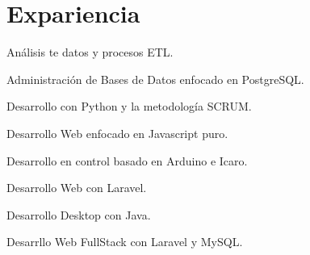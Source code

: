 \begin{minipage}[t]{0.66\textwidth} %


\section{Expariencia}

\vspace{\topsep} %
\begin{tightitemize}
\item Análisis te datos y procesos ETL.
\item Administración de Bases de Datos enfocado en PostgreSQL.
\item Desarrollo con Python y la metodología SCRUM.
\end{tightitemize}

\sectionspace %



\begin{tightitemize}
\item Desarrollo Web enfocado en Javascript puro.
\item Desarrollo en control basado en Arduino e Icaro.
\end{tightitemize}
\sectionspace %


\begin{tightitemize}
\item Desarrollo Web con Laravel.
\item Desarrollo Desktop con Java.
\end{tightitemize}
\sectionspace %


\begin{tightitemize}
\item Desarrllo Web FullStack con Laravel y MySQL.
\end{tightitemize}
\sectionspace %


\end{minipage}
